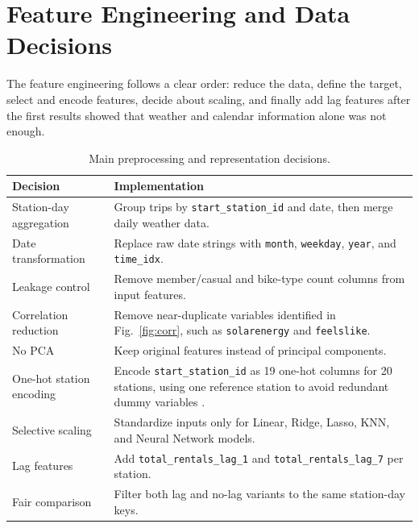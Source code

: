 \section{Feature Engineering and Data Decisions}
\label{sec:feature_engineering}

The feature engineering follows a clear order: reduce the data, define 
the target, select and encode features, decide about scaling, and finally 
add lag features after the first results showed that weather and calendar 
information alone was not enough.

\begin{table}[htbp]
\caption{Main preprocessing and representation decisions.}
\label{tab:preprocessing}
\centering
\scriptsize
\begin{tabularx}{\columnwidth}{p{} X}
\toprule
\textbf{Decision} & \textbf{Implementation} \\
\midrule
Station-day aggregation & 
Group trips by \texttt{start\_station\_id} and date, then merge 
daily weather data. \\
\addlinespace
Date transformation & 
Replace raw date strings with \texttt{month}, \texttt{weekday}, 
\texttt{year}, and \texttt{time\_idx}. \\
\addlinespace
Leakage control & 
Remove member/casual and bike-type count columns from input features. \\
\addlinespace
Correlation reduction & 
Remove near-duplicate variables identified in Fig.~\ref{fig:corr}, 
such as \texttt{solarenergy} and \texttt{feelslike}. \\
\addlinespace
No PCA & 
Keep original features instead of principal components. \\
\addlinespace
One-hot station encoding & 
Encode \texttt{start\_station\_id} as 19 one-hot columns for 20 stations, using one reference station to avoid redundant dummy variables \cite{sklearn_ohe}. \\
\addlinespace
Selective scaling & 
Standardize inputs only for Linear, Ridge, Lasso, KNN, and 
Neural Network models. \\
\addlinespace
Lag features & 
Add \texttt{total\_rentals\_lag\_1} and 
\texttt{total\_rentals\_lag\_7} per station. \\
\addlinespace
Fair comparison & 
Filter both lag and no-lag variants to the same station-day keys. \\
\bottomrule
\end{tabularx}
\end{table}

